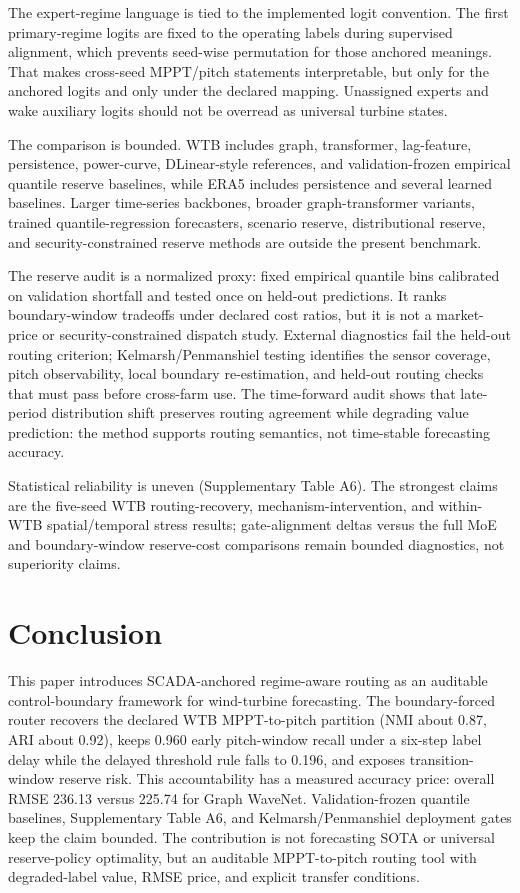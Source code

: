 \documentclass[
  11pt]{article}
\begin{document}
The expert-regime language is tied to the implemented logit convention.
The first primary-regime logits are fixed to the operating labels during
supervised alignment, which prevents seed-wise permutation for those
anchored meanings. That makes cross-seed MPPT/pitch statements
interpretable, but only for the anchored logits and only under the
declared mapping. Unassigned experts and wake auxiliary logits should
not be overread as universal turbine states.

The comparison is bounded. WTB includes graph, transformer, lag-feature,
persistence, power-curve, DLinear-style references, and
validation-frozen empirical quantile reserve baselines, while ERA5
includes persistence and several learned baselines. Larger time-series
backbones, broader graph-transformer variants, trained
quantile-regression forecasters, scenario reserve, distributional
reserve, and security-constrained reserve methods are outside the
present benchmark.

The reserve audit is a normalized proxy: fixed empirical quantile bins
calibrated on validation shortfall and tested once on held-out
predictions. It ranks boundary-window tradeoffs under declared cost
ratios, but it is not a market-price or security-constrained dispatch
study. External diagnostics fail the held-out routing criterion;
Kelmarsh/Penmanshiel testing identifies the sensor coverage, pitch
observability, local boundary re-estimation, and held-out routing checks
that must pass before cross-farm use. The time-forward audit shows that
late-period distribution shift preserves routing agreement while
degrading value prediction: the method supports routing semantics, not
time-stable forecasting accuracy.

Statistical reliability is uneven (Supplementary Table A6). The
strongest claims are the five-seed WTB routing-recovery,
mechanism-intervention, and within-WTB spatial/temporal stress results;
gate-alignment deltas versus the full MoE and boundary-window
reserve-cost comparisons remain bounded diagnostics, not superiority
claims.

\section{Conclusion}\label{conclusion}

This paper introduces SCADA-anchored regime-aware routing as an
auditable control-boundary framework for wind-turbine forecasting. The
boundary-forced router recovers the declared WTB MPPT-to-pitch partition
(NMI about 0.87, ARI about 0.92), keeps 0.960 early pitch-window recall
under a six-step label delay while the delayed threshold rule falls to
0.196, and exposes transition-window reserve risk. This accountability
has a measured accuracy price: overall RMSE 236.13 versus 225.74 for
Graph WaveNet. Validation-frozen quantile baselines, Supplementary Table
A6, and Kelmarsh/Penmanshiel deployment gates keep the claim bounded.
The contribution is not forecasting SOTA or universal reserve-policy
optimality, but an auditable MPPT-to-pitch routing tool with
degraded-label value, RMSE price, and explicit transfer conditions.
\end{document}
